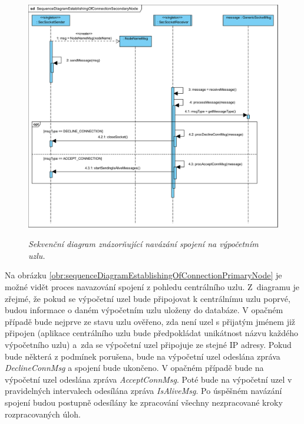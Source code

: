 \begin{figure}[H]
\begin{center}
    \scalebox{0.5}
    {
        \includegraphics{images/SequenceDiagramEstablishingOfConnectionSecondaryNode.pdf}
    }
    \caption{\label{obr:sequenceDiagramEstablishingOfConnectionSecondaryNode} {\it Sekvenční diagram znázorňující navázání spojení na výpočetním uzlu.}}
\end{center}
\end{figure}

Na obrázku \ref{obr:sequenceDiagramEstablishingOfConnectionPrimaryNode} je možné vidět proces navazování spojení z pohledu centrálního uzlu. Z~diagramu je zřejmé, že pokud se výpočetní uzel bude připojovat k centrálnímu uzlu poprvé, budou informace o daném výpočetním uzlu uloženy do databáze. V opačném případě bude nejprve ze stavu uzlu ověřeno, zda není uzel s přijatým jménem již připojen (aplikace centrálního uzlu bude předpokládat unikátnost názvu každého výpočetního uzlu) a~zda se výpočetní uzel připojuje ze stejné IP adresy. Pokud bude některá z podmínek porušena, bude na výpočetní uzel odeslána zpráva \textit{DeclineConnMsg} a spojení bude ukončeno. V opačném případě bude na výpočetní uzel odeslána zpráva \textit{AcceptConnMsg}. Poté bude na výpočetní uzel v pravidelných intervalech odesílána zpráva \textit{IsAliveMsg}. Po úspěšném navázání spojení budou postupně odesílány ke zpracování všechny nezpracované kroky rozpracovaných úloh.

